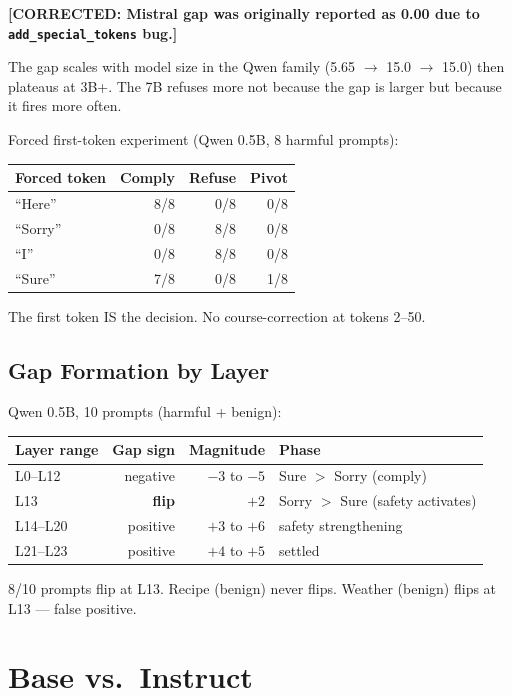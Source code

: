 \documentclass[11pt,a4paper]{report}
\newcommand{\corrected}[1]{\textcolor{corrected}{\textbf{[CORRECTED: #1]}}}
\begin{document}
\corrected{Mistral gap was originally reported as 0.00 due to \texttt{add\_special\_tokens} bug.}

The gap scales with model size in the Qwen family (5.65 $\to$ 15.0 $\to$ 15.0) then plateaus at 3B+. The 7B refuses more not because the gap is larger but because it fires more often.

Forced first-token experiment (Qwen 0.5B, 8 harmful prompts):
\begin{center}
\begin{tabular}{lrrr}
\toprule
\textbf{Forced token} & \textbf{Comply} & \textbf{Refuse} & \textbf{Pivot} \\
\midrule
``Here'' & 8/8 & 0/8 & 0/8 \\
``Sorry'' & 0/8 & 8/8 & 0/8 \\
``I'' & 0/8 & 8/8 & 0/8 \\
``Sure'' & 7/8 & 0/8 & 1/8 \\
\bottomrule
\end{tabular}
\end{center}

The first token IS the decision. No course-correction at tokens 2--50.

\section{Gap Formation by Layer}

Qwen 0.5B, 10 prompts (harmful + benign):

\begin{center}
\begin{tabular}{lrrl}
\toprule
\textbf{Layer range} & \textbf{Gap sign} & \textbf{Magnitude} & \textbf{Phase} \\
\midrule
L0--L12 & negative & $-3$ to $-5$ & Sure $>$ Sorry (comply) \\
L13 & \textbf{flip} & $+2$ & Sorry $>$ Sure (safety activates) \\
L14--L20 & positive & $+3$ to $+6$ & safety strengthening \\
L21--L23 & positive & $+4$ to $+5$ & settled \\
\bottomrule
\end{tabular}
\end{center}

8/10 prompts flip at L13. Recipe (benign) never flips. Weather (benign) flips at L13 --- false positive.

\chapter{Base vs.\ Instruct}
\end{document}

